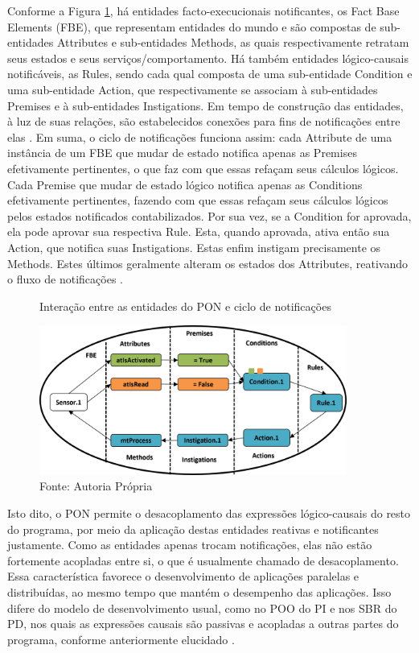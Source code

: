 Conforme a Figura \ref{fig:oshiro_pon}, há entidades facto-execucionais
notificantes, os Fact Base Elements (FBE), que representam entidades do mundo e
são compostas de sub-entidades Attributes e sub-entidades Methods, as quais
respectivamente retratam seus estados e seus serviços/comportamento. Há também
entidades lógico-causais notificáveis, as Rules, sendo cada qual composta de uma
sub-entidade Condition e uma sub-entidade Action, que respectivamente se
associam à sub-entidades Premises e à sub-entidades Instigations. Em tempo de
construção das entidades, à luz de suas relações, são estabelecidos conexões
para fins de notificações entre elas \cite{doc_ronszcka_2019,oshiro_2021}. Em
suma, o ciclo de notificações funciona assim: cada Attribute de uma instância de
um FBE que mudar de estado notifica apenas as Premises efetivamente pertinentes,
o que faz com que essas refaçam seus cálculos lógicos. Cada Premise que mudar de
estado lógico notifica apenas as Conditions efetivamente pertinentes, fazendo
com que essas refaçam seus cálculos lógicos pelos estados notificados
contabilizados. Por sua vez, se a Condition for aprovada, ela pode aprovar sua
respectiva Rule. Esta, quando aprovada, ativa então sua Action, que notifica
suas Instigations. Estas enfim instigam precisamente os Methods. Estes últimos
geralmente alteram os estados dos Attributes, reativando o fluxo de notificações
\cite{doc_ronszcka_2019,oshiro_2021}.

\begin{figure}[!htb]
  \centering
  \caption{Interação entre as entidades do PON e ciclo de notificações}
  \includegraphics[width=0.9\textwidth]{../figures/nop_cycle.png}
  \smallskip
  \caption*{Fonte: Autoria Própria}
  \label{fig:oshiro_pon}
\end{figure}

Isto dito, o PON permite o desacoplamento das expressões lógico-causais do resto
do programa, por meio da aplicação destas entidades reativas e notificantes
justamente. Como as entidades apenas trocam notificações, elas não estão
fortemente acopladas entre si, o que é usualmente chamado de desacoplamento.
Essa característica favorece o desenvolvimento de aplicações paralelas e
distribuídas, ao mesmo tempo que mantém o desempenho das aplicações. Isso difere
do modelo de desenvolvimento usual, como no POO do PI e nos SBR do PD, nos quais
as expressões causais são passivas e acopladas a outras partes do programa,
conforme anteriormente elucidado
\cite{pat_simao_2008,simao_2009,msc_Banaszewski_2009,simao_2012a,doc_ronszcka_2019}.

